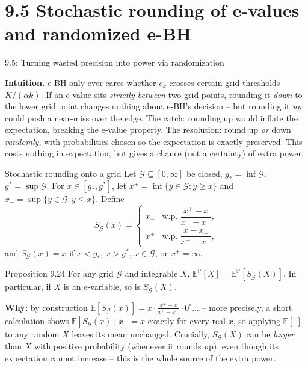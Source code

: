 \documentclass[aspectratio=169,10pt]{beamer}
\begin{document}
\section{9.5 Stochastic rounding of e-values and randomized e-BH}

\begin{frame}[allowframebreaks]{9.5: Turning wasted precision into power via randomization}

\textbf{Intuition.} e-BH only ever cares whether $e_k$ crosses certain grid thresholds $K/(\alpha k)$. If an e-value sits \emph{strictly between} two grid points, rounding it \emph{down} to the lower grid point changes nothing about e-BH's decision -- but rounding it \emph{up} could push a near-miss over the edge. The catch: rounding up would inflate the expectation, breaking the e-value property. The resolution: round up \emph{or} down \emph{randomly}, with probabilities chosen so the expectation is exactly preserved. This costs nothing in expectation, but gives a chance (not a certainty) of extra power.

\begin{block}{Stochastic rounding onto a grid}
Let $\mathcal{G}\subseteq[0,\infty]$ be closed, $g_\ast=\inf\mathcal{G}$, $g^\ast=\sup\mathcal{G}$. For $x\in[g_\ast,g^\ast]$, let $x^+ = \inf\{y\in\mathcal{G}:y\ge x\}$ and $x_- = \sup\{y\in\mathcal{G}:y\le x\}$. Define
\[
S_{\mathcal{G}}(x) = \begin{cases} x_- & \text{w.p. } \dfrac{x^+-x}{x^+-x_-}, \\[4pt] x^+ & \text{w.p. } \dfrac{x-x_-}{x^+-x_-}, \end{cases}
\]
and $S_{\mathcal{G}}(x)=x$ if $x<g_\ast$, $x>g^\ast$, $x\in\mathcal{G}$, or $x^+=\infty$.
\end{block}

\framebreak

\begin{block}{Proposition 9.24}
For any grid $\mathcal{G}$ and integrable $X$, $\mathbb{E}^{\mathbb{P}}[X] = \mathbb{E}^{\mathbb{P}}[S_\mathcal{G}(X)]$. In particular, if $X$ is an e-variable, so is $S_\mathcal{G}(X)$.
\end{block}
\textbf{Why:} by construction $\mathbb{E}[S_\mathcal{G}(x)] = x\cdot\frac{x^+-x}{x^+-x_-}\cdot 0^\circ \dots$ -- more precisely, a short calculation shows $\mathbb{E}[S_\mathcal{G}(x)\mid x]=x$ exactly for every real $x$, so applying $\mathbb{E}[\cdot]$ to any random $X$ leaves its mean unchanged. Crucially, $S_\mathcal{G}(X)$ can be \emph{larger} than $X$ with positive probability (whenever it rounds up), even though its expectation cannot increase -- this is the whole source of the extra power.


\end{frame}
\end{document}
